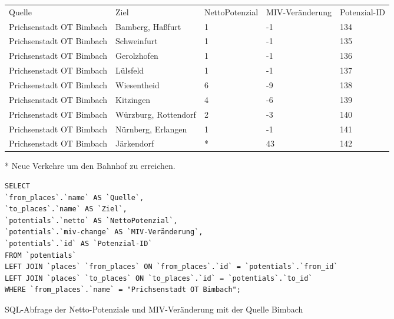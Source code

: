 \begin{tabular}{ l  l  l  l  l }
Quelle & Ziel & NettoPotenzial & MIV-Veränderung & Potenzial-ID\\ 
Prichsenstadt OT Bimbach & Bamberg, Haßfurt & 1 & -1 & 134\\ 
Prichsenstadt OT Bimbach & Schweinfurt & 1 & -1 & 135\\ 
Prichsenstadt OT Bimbach & Gerolzhofen & 1 & -1 & 136\\ 
Prichsenstadt OT Bimbach & Lülsfeld & 1 & -1 & 137\\ 
Prichsenstadt OT Bimbach & Wiesentheid & 6 & -9 & 138\\ 
Prichsenstadt OT Bimbach & Kitzingen & 4 & -6 & 139\\ 
Prichsenstadt OT Bimbach & Würzburg, Rottendorf & 2 & -3 & 140\\ 
Prichsenstadt OT Bimbach & Nürnberg, Erlangen & 1 & -1 & 141\\ 
Prichsenstadt OT Bimbach & Järkendorf & * & 43 & 142\\ 
\end{tabular}
\newline
\newline
* Neue Verkehre um den Bahnhof zu erreichen.
\newline
\begin{listing}[htbp]
\begin{verbatim}
SELECT
`from_places`.`name` AS `Quelle`, 
`to_places`.`name` AS `Ziel`, 
`potentials`.`netto` AS `NettoPotenzial`, 
`potentials`.`miv-change` AS `MIV-Veränderung`, 
`potentials`.`id` AS `Potenzial-ID`
FROM `potentials`
LEFT JOIN `places` `from_places` ON `from_places`.`id` = `potentials`.`from_id`
LEFT JOIN `places` `to_places` ON `to_places`.`id` = `potentials`.`to_id`
WHERE `from_places`.`name` = "Prichsenstadt OT Bimbach";
\end{verbatim}
\caption{SQL-Abfrage der Netto-Potenziale und MIV-Veränderung mit der Quelle Bimbach}\label{lst-fz-bimbach}
\end{listing}